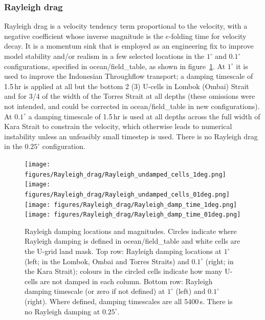 \documentclass[11pt]{article}
\newcommand{\paramsty}[1]{\textsf{#1}}
\newcommand{\param}[1]{\paramsty{#1}\index{\paramsty{#1}}}
\begin{document}
\subsubsection{Rayleigh drag}\label{S:Rayleigh}
Rayleigh drag is a velocity tendency term proportional to the velocity, with a negative coefficient whose inverse magnitude is the $e$-folding time for velocity decay.
It is a momentum sink that is employed as an engineering fix to improve model stability and/or realism in a few selected locations in the $1^\circ$ and $0.1^\circ$ configurations, specified in \paramsty{ocean/}\param{field_table}, as shown in figure~\ref{F:Rayleigh}.
At $1^\circ$ it is used to improve the Indonesian Throughflow transport; a damping timescale of 1.5\,hr is applied at all but the bottom 2 (3) U-cells in Lombok (Ombai) Strait and for 3/4 of the width of the Torres Strait at all depths (these omissions were not intended, and could be corrected in \paramsty{ocean/}\param{field_table} in new configurations).
At $0.1^\circ$ a damping timescale of 1.5\,hr is used at all depths across the full width of Kara Strait to constrain the velocity, which otherwise leads to numerical instability unless an unfeasibly small timestep is used.
There is no Rayleigh drag in the $0.25^\circ$ configuration.

\begin{figure}
\begin{center}
\texttt{[image: figures/Rayleigh\_drag/Rayleigh\_undamped\_cells\_1deg.png]}\quad
\texttt{[image: figures/Rayleigh\_drag/Rayleigh\_undamped\_cells\_01deg.png]}\\
\texttt{[image: figures/Rayleigh\_drag/Rayleigh\_damp\_time\_1deg.png]}\quad
\texttt{[image: figures/Rayleigh\_drag/Rayleigh\_damp\_time\_01deg.png]}
\end{center}
\caption[Rayleigh damping locations and magnitudes.]{
Rayleigh damping locations and magnitudes.
Circles indicate where Rayleigh damping is defined in \paramsty{ocean/}\param{field_table} and white cells are the U-grid land mask.
Top row: Rayleigh damping locations at $1^\circ$ (left; in the Lombok, Ombai and Torres Straits) and $0.1^\circ$ (right; in the Kara Strait); colours in the circled cells indicate how many U-cells are not damped in each column.
Bottom row: Rayleigh damping timescale (or zero if not defined) at $1^\circ$ (left) and $0.1^\circ$ (right). 
Where defined, damping timescales are all 5400\,s. 
There is no Rayleigh damping at $0.25^\circ$.
\label{F:Rayleigh}
}
\end{figure}
\end{document}
